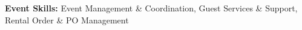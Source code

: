 \textbf{Event Skills:} Event Management \& Coordination, Guest Services \& Support, Rental Order \& PO Management \\
